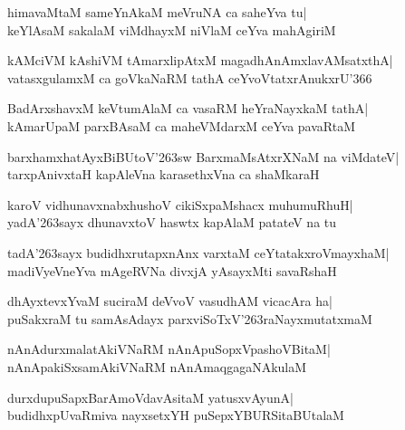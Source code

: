 \documentclass[twoside,12pt,openright]{book}
\def\S{\char'263}
\newcounter{shloka}[chapter]
\begin{document}
\begin{shloka}%
himavaMtaM sameYnAkaM meVruNA ca saheYva tu|\\
keYlAsaM sakalaM viMdhayxM niVlaM ceYva mahAgiriM
\end{shloka}

\begin{shloka}%
kAMciVM kAshiVM tAmarxlipAtxM magadhAnAmxlavAMsatxthA|\\
vatasxgulamxM ca goVkaNaRM tathA ceYvoVtatxrAnukxrU\char'366
\end{shloka}

\begin{shloka}%
BadArxshavxM keVtumAlaM ca vasaRM heYraNayxkaM tathA|\\
kAmarUpaM parxBAsaM ca maheVMdarxM ceYva pavaRtaM
\end{shloka}

\begin{shloka}%
barxhamxhatAyxBiBUtoV\S sw BarxmaMsAtxrXNaM na viMdateV|\\
tarxpAnivxtaH kapAleVna karasethxVna ca shaMkaraH
\end{shloka}

\begin{shloka}%
karoV vidhunavxnabxhushoV cikiSxpaMshacx muhumuRhuH|\\
yadA\S sayx dhunavxtoV haswtx kapAlaM patateV na tu
\end{shloka}

\begin{shloka}%
tadA\S sayx budidhxrutapxnAnx varxtaM ceYtatakxroVmayxhaM|\\
madiVyeVneYva mAgeRVNa divxjA yAsayxMti savaRshaH
\end{shloka}

\begin{shloka}%
dhAyxtevxYvaM suciraM deVvoV vasudhAM vicacAra ha|\\
puSakxraM tu samAsAdayx parxviSoTxV\S raNayxmutatxmaM
\end{shloka}

\begin{shloka}%
nAnAdurxmalatAkiVNaRM nAnApuSopxVpashoVBitaM|\\
nAnApakiSxsamAkiVNaRM nAnAmaqgagaNAkulaM
\end{shloka}

\begin{shloka}%
durxdupuSapxBarAmoVdavAsitaM yatusxvAyunA|\\
budidhxpUvaRmiva nayxsetxYH puSepxYBURSitaBUtalaM
\end{shloka}
\end{document}
